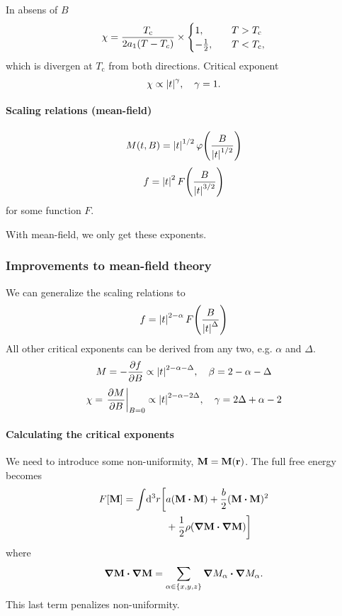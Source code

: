 \documentclass[11pt,letter, swedish, english, twocolumn
]{article}
\newcommand{\Tc}{\ensuremath{{T_{\text{c}}}}}
\begin{document}
In absens of $B$
\begin{equation}
\chi=\frac{\Tc}{2a_1(T-T_c)}\times
\begin{cases}
1, &T>\Tc\\
-\frac{1}{2}\qcomma &T<\Tc,
\end{cases}
\end{equation}
which is divergen at $\Tc$ from both directions. 
Critical exponent
\begin{equation}
\chi\propto \abs{t}^{\gamma}\qcomma \gamma=1.
\end{equation}

\paragraph{Scaling relations (mean-field)}
\begin{equation}
M(t,B)=\abs{t}^{1/2}\,\varphi\qty(\frac{B}{\abs{t}^{1/2}})
\end{equation}
\begin{equation}
f=\abs{t}^2\,F\qty(\frac{B}{\abs{t}^{3/2}})
\end{equation}
for some function $F$.

With mean-field, we only get these exponents.


\subsubsection{Improvements to mean-field theory}
We can generalize the scaling relations to
\begin{equation}
f=\abs{t}^{2-\alpha}\,F\qty(\frac{B}{\abs{t}^{\Delta}})
\end{equation}
All other critical exponents can be derived from any two,
e.g. $\alpha$ and $\Delta$. 
\begin{equation}
M=-\pdv{f}{B}\propto \abs{t}^{2-\alpha-\Delta}\qcomma
\beta=2-\alpha-\Delta
\end{equation}
\begin{equation}
\chi=\eval{\pdv{M}{B}}_{B=0}\propto \abs{t}^{2-\alpha-2\Delta}
\qcomma \gamma=2\Delta+\alpha-2
\end{equation}


\paragraph{Calculating the critical exponents}
We need to introduce some non-uniformity, $\vb{M}=\vb{M}(\vb{r})$. The
full free energy becomes 
\begin{equation}
\begin{aligned}
F[\vb{M}]=\int\!\rd^3r\bigg[&a(\vb{M}\vdot\vb{M})+
\frac{b}{2}(\vb{M}\vdot\vb{M})^{2}\\
&+\frac{1}{2}\rho (\grad\vb{M}\vdot\grad\vb{M})\bigg]
\end{aligned}
\end{equation}
where
\begin{equation}
\grad\vb{M}\vdot\grad\vb{M} = \sum_{\alpha\in\{x,y,z\}} 
\grad{M_\alpha}\vdot\grad{M_\alpha}.
\end{equation}
This last term penalizes non-uniformity.
\end{document}
